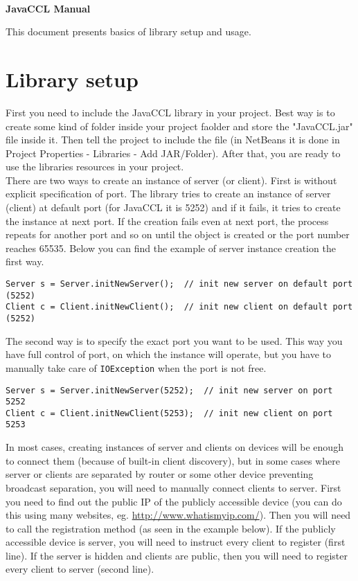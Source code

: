 \documentclass[a4paper,12pt]{article}
\date{September 13, 2013}
\newcommand{\classname}[1]{\texttt{#1}}
\begin{document}
\logo
\\\vspace{6pt}
\begin{center}
\large{\bfseries JavaCCL Manual}
\end{center}
This document presents basics of library setup and usage.
\section{Library setup}
First you need to include the JavaCCL library in your project. Best way is to create some kind of folder inside your project faolder and store the "JavaCCL.jar" file inside it. Then tell the project to include the file (in NetBeans it is done in Project Properties - Libraries - Add JAR/Folder). After that, you are ready to use the libraries resources in your project.
\\There are two ways to create an instance of server (or client). First is without explicit specification of port. The library tries to create an instance of server (client) at default port (for JavaCCL it is 5252) and if it fails, it tries to create the instance at next port. If the creation fails even at next port, the process repeats for another port and so on until the object is created or the port number reaches 65535. Below you can find the example of server instance creation the first way.
\lstset{language=Java}
\begin{lstlisting}
Server s = Server.initNewServer();	// init new server on default port (5252)
Client c = Client.initNewClient();	// init new client on default port (5252)
\end{lstlisting}
The second way is to specify the exact port you want to be used. This way you have full control of port, on which the instance will operate, but you have to manually take care of \classname{IOException} when the port is not free.
\begin{lstlisting}
Server s = Server.initNewServer(5252);	// init new server on port 5252
Client c = Client.initNewClient(5253);	// init new client on port 5253
\end{lstlisting}
In most cases, creating instances of server and clients on devices will be enough to connect them (because of built-in client discovery), but in some cases where server or clients are separated by router or some other device preventing broadcast separation, you will need to manually connect clients to server. First you need to find out the public IP of the publicly accessible device (you can do this using many websites, eg. \url{http://www.whatismyip.com/}). Then you will need to call the registration method (as seen in the example below). If the publicly accessible device is server, you will need to instruct every client to register (first line). If the server is hidden and clients are public, then you will need to register every client to server (second line).
\end{document}
